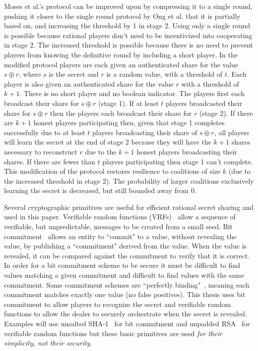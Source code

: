 \documentclass[12pt]{dalcsthesis}
\begin{document}
Moses et al.'s protocol can be improved upon by compressing it to a single round, pushing it closer to the single round protocol by Ong et al.\cite{ong09} that it is partially based on, and increasing the threshold by 1 in stage 2. Using only a single round is possible because rational players don't need to be incentivized into cooperating in stage 2. The increased threshold is possible because there is no need to prevent players from knowing the definitive round by including a short player. In the modified protocol players are each given an authenticated share for the value $s \oplus r$, where $s$ is the secret and $r$ is a random value, with a threshold of $t$. Each player is also given an authenticated share for the value $r$ with a threshold of $k+1$. There is no short player and no boolean indicator. The players first each broadcast their share for $s \oplus r$ (stage 1). If at least $t$ players broadcasted their share for $s \oplus r$ then the players each broadcast their share for $r$ (stage 2). If there are $k+1$ honest players participating then, given that stage 1 completes successfully due to at least $t$ players broadcasting their share of $s \oplus r$, all players will learn the secret at the end of stage 2 because they will have the $k+1$ shares necessary to reconstruct $r$ due to the $k+1$ honest players broadcasting their shares. If there are fewer than $t$ players participating then stage 1 can't complete. This modification of the protocol restores resilience to coalitions of size $k$ (due to the increased threshold in stage 2). The probability of larger coalitions exclusively learning the secret is decreased, but still bounded away from 0.

Several cryptographic primitives are useful for efficient rational secret sharing and used in this paper. Verifiable random functions (VRFs)~\cite{dis05, micali99} allow a sequence of verifiable, but unpredictable, messages to be created from a small seed. Bit commitment~\cite{Damg02, naor91} allows an entity to ``commit" to a value, without revealing the value, by publishing a ``commitment" derived from the value. When the value is revealed, it can be compared against the commitment to verify that it is correct. In order for a bit commitment scheme to be secure it must be difficult to find values matching a given commitment and difficult to find values with the same commitment. Some commitment schemes are ``perfectly binding"~\cite{Damg02}, meaning each commitment matches exactly one value (no false positives). This thesis uses bit commitment to allow players to recognize the secret and verifiable random functions to allow the dealer to securely orchestrate when the secret is revealed. Examples will use unsalted SHA-1~\cite{sha08} for bit commitment and unpadded RSA~\cite{rsa78} for verifiable random functions but these basic primitives are used \emph{for their simplicity, not their security}.
\end{document}
